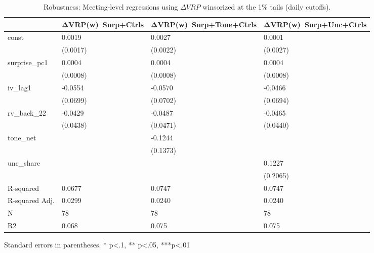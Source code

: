 \begin{table}
\caption{Robustness: Meeting-level regressions using $\Delta VRP$ winsorized at the 1\% tails (daily cutoffs).}
\label{tab:meet_dvrp_winsor}
\begin{center}
\begin{tabular}{llll}
\hline
               & ΔVRP(w)~Surp+Ctrls & ΔVRP(w)~Surp+Tone+Ctrls & ΔVRP(w)~Surp+Unc+Ctrls  \\
\hline
const          & 0.0019             & 0.0027                  & 0.0001                  \\
               & (0.0017)           & (0.0022)                & (0.0027)                \\
surprise\_pc1  & 0.0004             & 0.0004                  & 0.0004                  \\
               & (0.0008)           & (0.0008)                & (0.0008)                \\
iv\_lag1       & -0.0554            & -0.0570                 & -0.0466                 \\
               & (0.0699)           & (0.0702)                & (0.0694)                \\
rv\_back\_22   & -0.0429            & -0.0487                 & -0.0465                 \\
               & (0.0438)           & (0.0471)                & (0.0440)                \\
tone\_net      &                    & -0.1244                 &                         \\
               &                    & (0.1373)                &                         \\
unc\_share     &                    &                         & 0.1227                  \\
               &                    &                         & (0.2065)                \\
R-squared      & 0.0677             & 0.0747                  & 0.0747                  \\
R-squared Adj. & 0.0299             & 0.0240                  & 0.0240                  \\
N              & 78                 & 78                      & 78                      \\
R2             & 0.068              & 0.075                   & 0.075                   \\
\hline
\end{tabular}
\end{center}
\end{table}
\bigskip
Standard errors in parentheses. \newline 
* p<.1, ** p<.05, ***p<.01
